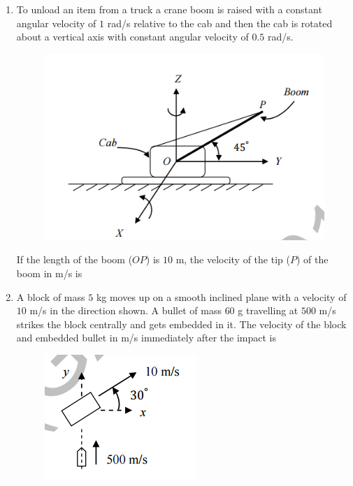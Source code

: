 \documentclass[a4paper,10pt]{article}
\begin{document}
\begin{enumerate}
    \item To unload an item from a truck a crane boom is raised with a constant angular velocity of $1$ rad/s relative to the cab and then the cab is rotated about a vertical axis with constant angular velocity of $0.5$ rad/s.
    \begin{figure}[H] \centering \includegraphics[width=0.6\columnwidth]{q20_solid.png} \caption*{} \label{fig:q20_solid} \end{figure}
    If the length of the boom ($OP$) is $10$ m, the velocity of the tip ($P$) of the boom in m/s is
    
    \hfill{}
    \begin{enumerate}
    \end{enumerate}

    \item A block of mass $5$ kg moves up on a smooth inclined plane with a velocity of $10$ m/s in the direction shown. A bullet of mass $60$ g travelling at $500$ m/s strikes the block centrally and gets embedded in it. The velocity of the block and embedded bullet in m/s immediately after the impact is
    \begin{figure}[H] \centering \includegraphics[width=0.4\columnwidth]{q21_solid.png} \caption*{} \label{fig:q21_solid} \end{figure}
    

\end{enumerate}
\end{document}
